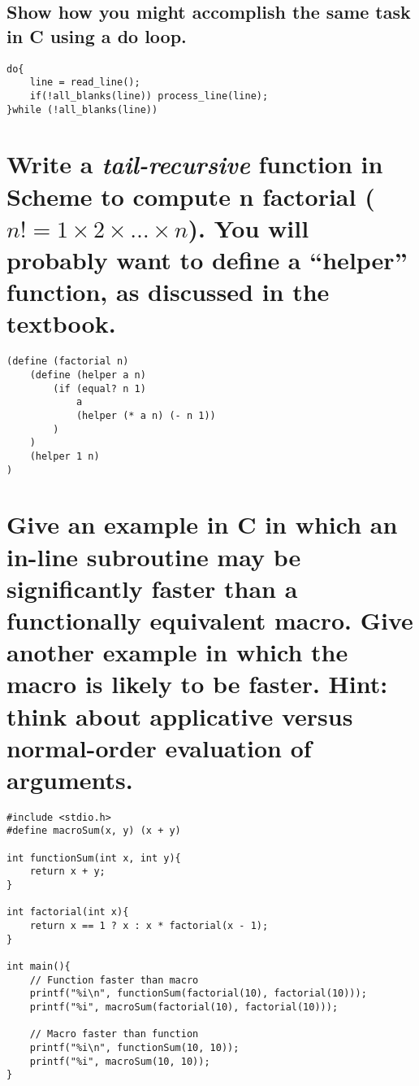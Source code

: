 \documentclass[letterpaper]{article}
\begin{document}
\subsection{Show how you might accomplish the same task in C using a do loop.}
\begin{adjustwidth}{2.35em}{0pt}
\begin{lstlisting}
do{
	line = read_line();
	if(!all_blanks(line)) process_line(line);
}while (!all_blanks(line))
\end{lstlisting}
\end{adjustwidth}

\section{Write a \textit{tail-recursive} function in Scheme to compute n factorial ($n! = 1\times2\times\dots\times n$). You will probably want to define a “helper” function, as discussed in the textbook.}
\begin{adjustwidth}{2.35em}{0pt}
\begin{Verbatim}[tabsize=4]
(define (factorial n)
	(define (helper a n)
		(if (equal? n 1)
			a
			(helper (* a n) (- n 1))
		)
	)
	(helper 1 n)
)
\end{Verbatim}
\end{adjustwidth}

\section{Give an example in C in which an in-line subroutine may be significantly faster than a functionally equivalent macro. Give another example in which the macro is likely to be faster. Hint: think about applicative versus normal-order evaluation of arguments.}
\begin{adjustwidth}{2.35em}{0pt}
\begin{lstlisting}
#include <stdio.h>
#define macroSum(x, y) (x + y)

int functionSum(int x, int y){
	return x + y;
}

int factorial(int x){
	return x == 1 ? x : x * factorial(x - 1);
}

int main(){
	// Function faster than macro
	printf("%i\n", functionSum(factorial(10), factorial(10)));
	printf("%i", macroSum(factorial(10), factorial(10)));

	// Macro faster than function
	printf("%i\n", functionSum(10, 10));
	printf("%i", macroSum(10, 10));
}
\end{lstlisting}
\end{adjustwidth}
\end{document}
